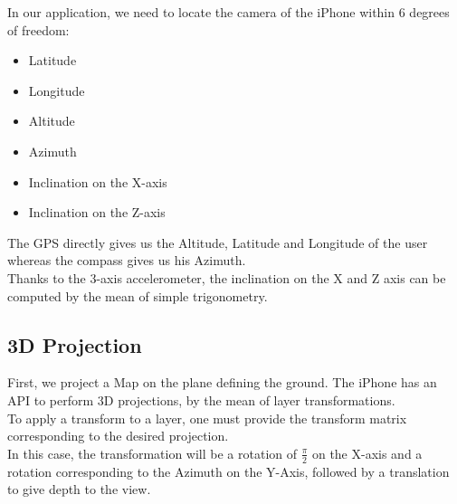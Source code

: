 In our application, we need to locate the camera of the iPhone within 6 degrees of freedom:

\begin{itemize}
\item{Latitude}
\item{Longitude}
\item{Altitude}
\item{Azimuth}
\item{Inclination on the X-axis}
\item{Inclination on the Z-axis}
\end{itemize}

The GPS directly gives us the Altitude, Latitude and Longitude of the user whereas the compass gives us his Azimuth.\\

Thanks to the 3-axis accelerometer, the inclination on the X and Z axis can be computed by the mean of simple trigonometry.

\subsection{3D Projection}

First, we project a Map on the plane defining the ground. The iPhone has an API to perform 3D projections, by the mean of layer transformations.\\

To apply a transform to a layer, one must provide the transform matrix corresponding to the desired projection.\\

In this case, the transformation will be a rotation of $\frac{\pi}{2}$ on the X-axis and a rotation corresponding to the Azimuth on the Y-Axis, followed by a translation to give depth to the view.
